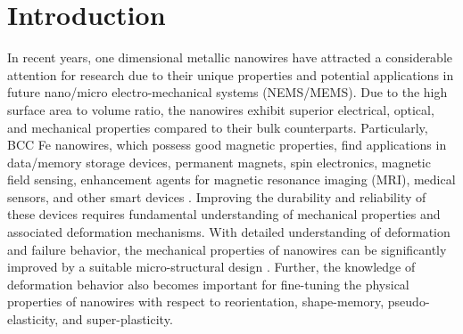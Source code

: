 \documentclass[%
reprint,%
 amssymb, amsmath,%
 aip,apl,%
]{revtex4-1}
\begin{document}
\maketitle

\section{Introduction}

In recent years, one dimensional metallic nanowires have attracted a considerable attention for research due to their unique 
properties and potential applications in future nano/micro electro-mechanical systems (NEMS/MEMS)\cite{Lieber}. Due to the high 
surface area to volume ratio, the nanowires exhibit superior electrical, optical, and mechanical properties compared to their 
bulk counterparts. Particularly, BCC Fe nanowires, which possess good magnetic properties, find applications in data/memory 
storage devices, permanent magnets, spin electronics, magnetic field sensing, enhancement agents for magnetic resonance imaging 
(MRI), medical sensors, and other smart devices \cite{Appl-1,Appl-2,Appl-3}. Improving the durability and reliability of these 
devices requires fundamental understanding of mechanical properties and associated deformation mechanisms. With detailed 
understanding of deformation and failure behavior, the mechanical properties of nanowires can be significantly improved by 
a suitable micro-structural design \cite{angstrom-scale-twins}. Further, the knowledge of deformation behavior also becomes 
important for fine-tuning the physical properties of nanowires with respect to reorientation, shape-memory, pseudo-elasticity, 
and super-plasticity.
\end{document}
